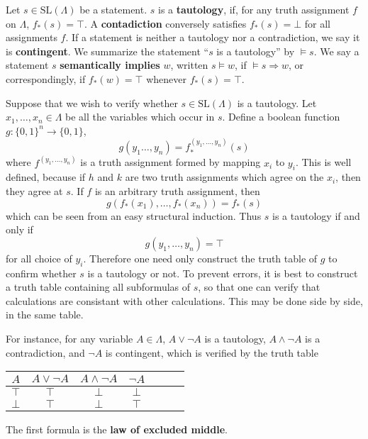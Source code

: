 Let $s \in \text{SL}(\Lambda)$ be a statement. $s$ is a {\bf tautology}, if, for any truth assignment $f$ on $\Lambda$, $f_*(s) = \top$. A {\bf contadiction} conversely satisfies $f_*(s) = \bot$ for all assignments $f$. If a statement is neither a tautology nor a contradiction, we say it is {\bf contingent}. We summarize the statement ``$s$ is a tautology'' by $\vDash s$. We say a statement $s$ {\bf semantically implies} $w$, written $s \vDash w$, if $\vDash s \Rightarrow w$, or correspondingly, if $f_*(w) = \top$ whenever $f_*(s) = \top$.

Suppose that we wish to verify whether $s \in \text{SL}(\Lambda)$ is a tautology. Let $x_1, \dots, x_n \in \Lambda$ be all the variables which occur in $s$. Define a boolean function $g: \{ 0, 1 \}^n \to \{ 0, 1 \}$,
%
\[ g(y_1 \dots, y_n) = f^{(y_1, \dots, y_n)}_*(s) \]
%
where $f^{(y_1, \dots, y_n)}$ is a truth assignment formed by mapping $x_i$ to $y_i$. This is well defined, because if $h$ and $k$ are two truth assignments which agree on the $x_i$, then they agree at $s$. If $f$ is an arbitrary truth assignment, then
%
\[ g(f_*(x_1), \dots, f_*(x_n)) = f_*(s) \]
%
which can be seen from an easy structural induction. Thus $s$ is a tautology if and only if
%
\[ g(y_1, \dots, y_n) = \top \]
%
for all choice of $y_i$. Therefore one need only construct the truth table of $g$ to confirm whether $s$ is a tautology or not. To prevent errors, it is best to construct a truth table containing all subformulas of $s$, so that one can verify that calculations are consistant with other calculations. This may be done side by side, in the same table.

\begin{example}
    For instance, for any variable $A \in \Lambda$, $A \vee \neg A$ is a tautology, $A \wedge \neg A$ is a contradiction, and $\neg A$ is contingent, which is verified by the truth table
    \begin{center}
    \begin{tabular}{| c | c | c | c | c | c | c |}
        \hline $A$ & $A \vee \neg A$ & $A \wedge \neg A$ & $\neg A$ \\
        \hline $\top$ & $\top$ & $\bot$ & $\bot$ \\
               $\bot$ & $\top$ & $\bot$ & $\top$ \\
        \hline
    \end{tabular}
    \end{center}
    The first formula is the {\bf law of excluded middle}.
\end{example}

